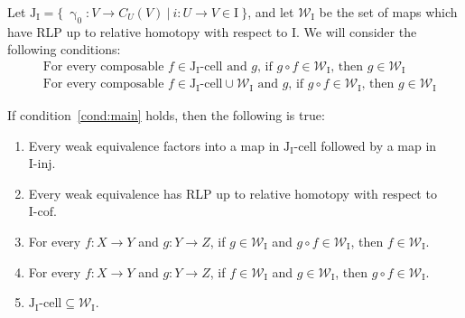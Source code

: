 \documentclass{tac}
\theoremstyle{definition}
\newcommand{\we}{\mathcal{W}}
\newcommand{\I}{\mathrm{I}}
\newcommand{\J}{\mathrm{J}}
\newcommand{\class}[2]{#1\text{-}\mathrm{#2}}
\newcommand{\Iinj}[1][\I]{\class{#1}{inj}}
\newcommand{\Icell}[1][\I]{\class{#1}{cell}}
\newcommand{\Icof}[1][\I]{\class{#1}{cof}}
\newcommand{\Jcell}[1][]{\Icell[\J#1]}
\newcommand{\cyli}{\upgamma}
\begin{document}
Let $\J_\I = \{\ \cyli_0 : V \to C_U(V)\ |\ i : U \to V \in \I \ \}$, and
let $\we_\I$ be the set of maps which have RLP up to relative homotopy with respect to $\I$.
We will consider the following conditions:
\begin{align}
& \text{For every composable $f \in \Jcell[_\I]$ and $g$, if $g \circ f \in \we_\I$, then $g \in \we_\I$} \label{cond:main} \tag{*} \\
& \text{For every composable $f \in \Jcell[_\I] \cup \we_\I$ and $g$, if $g \circ f \in \we_\I$, then $g \in \we_\I$} \label{cond:strong-main} \tag{*'}
\end{align}

\begin{lem}[main]
If condition~\eqref{cond:main} holds, then the following is true:
\begin{enumerate}
\item Every weak equivalence factors into a map in $\Jcell[_\I]$ followed by a map in $\Iinj$.
\item Every weak equivalence has RLP up to relative homotopy with respect to $\Icof$.
\item \label{it:we-top} For every $f : X \to Y$ and $g : Y \to Z$, if $g \in \we_\I$ and $g \circ f \in \we_\I$, then $f \in \we_\I$.
\item For every $f : X \to Y$ and $g : Y \to Z$, if $f \in \we_\I$ and $g \in \we_\I$, then $g \circ f \in \we_\I$.
\item $\Jcell[_\I] \subseteq \we_\I$.
\end{enumerate}
\end{lem}
\end{document}
